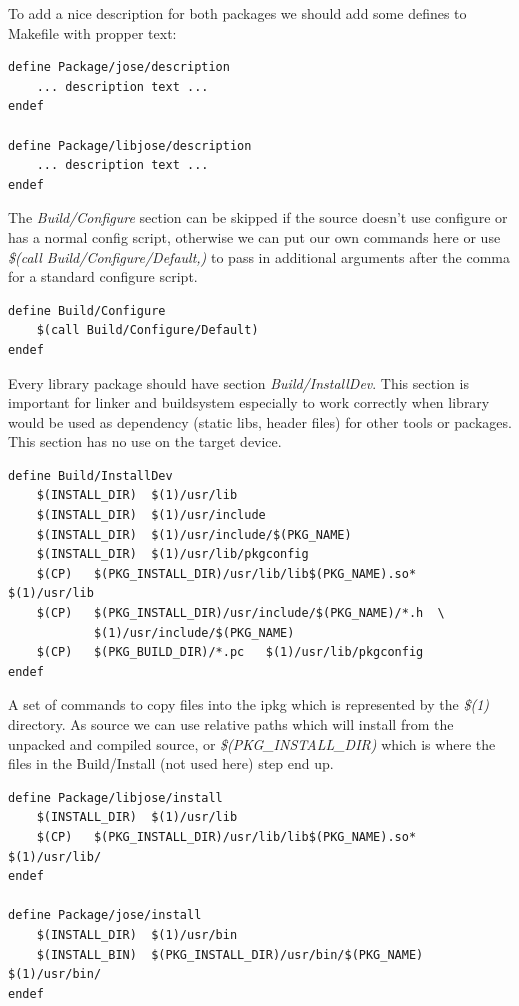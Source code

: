 To add a nice description for both packages we should add some defines to Makefile with propper text:
\begin{lstlisting}[columns=fixed,basicstyle=\ttfamily\footnotesize,tabsize=4,backgroundcolor=\color{yellow!10}]
define Package/jose/description
	... description text ...
endef

define Package/libjose/description
	... description text ...
endef
\end{lstlisting}
The {\it Build/Configure} section can be skipped if the source doesn't use configure or has a normal config script, otherwise we can put our own commands here or use {\it \$(call Build/Configure/Default,)} to pass in additional arguments after the comma for a standard configure script.
\begin{lstlisting}[columns=fixed,basicstyle=\ttfamily\footnotesize,tabsize=4,backgroundcolor=\color{yellow!10}]
define Build/Configure
	$(call Build/Configure/Default)
endef
\end{lstlisting}
Every library package should have section {\it Build/InstallDev}.
This section is important for linker and buildsystem especially to work correctly when library would be used as dependency (static libs, header files) for other tools or packages.
This section has no use on the target device.
\begin{lstlisting}[columns=fixed,basicstyle=\ttfamily\footnotesize,tabsize=4,backgroundcolor=\color{yellow!10}]
define Build/InstallDev
	$(INSTALL_DIR)	$(1)/usr/lib
	$(INSTALL_DIR)  $(1)/usr/include
	$(INSTALL_DIR)	$(1)/usr/include/$(PKG_NAME)
	$(INSTALL_DIR)	$(1)/usr/lib/pkgconfig
	$(CP)	$(PKG_INSTALL_DIR)/usr/lib/lib$(PKG_NAME).so*	$(1)/usr/lib
	$(CP)	$(PKG_INSTALL_DIR)/usr/include/$(PKG_NAME)/*.h	\
			$(1)/usr/include/$(PKG_NAME)
	$(CP)	$(PKG_BUILD_DIR)/*.pc	$(1)/usr/lib/pkgconfig
endef
\end{lstlisting}
A set of commands to copy files into the ipkg which is represented by the {\it \$(1)} directory.
As source we can use relative paths which will install from the unpacked and compiled source, or {\it \$(PKG\_INSTALL\_DIR)} which is where the files in the Build/Install (not used here) step end up.
\begin{lstlisting}[columns=fixed,basicstyle=\ttfamily\footnotesize,tabsize=4,backgroundcolor=\color{yellow!10}]
define Package/libjose/install
	$(INSTALL_DIR)	$(1)/usr/lib
	$(CP)	$(PKG_INSTALL_DIR)/usr/lib/lib$(PKG_NAME).so*	$(1)/usr/lib/
endef

define Package/jose/install
	$(INSTALL_DIR)	$(1)/usr/bin
	$(INSTALL_BIN)	$(PKG_INSTALL_DIR)/usr/bin/$(PKG_NAME)	$(1)/usr/bin/
endef
\end{lstlisting}
